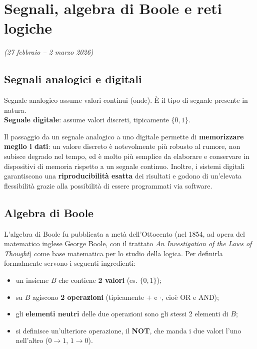 \chapter{Segnali, algebra di Boole e reti logiche}
\label{ch:boole-intro}
\textit{(27 febbraio -- 2 marzo 2026)}

\section{Segnali analogici e digitali}

\begin{definizione}{Segnale analogico}
assume valori continui (onde). È il tipo di segnale presente in natura.\\[0.3em]
\textbf{Segnale digitale}: assume valori discreti, tipicamente $\{0,1\}$.
\end{definizione}

Il passaggio da un segnale analogico a uno digitale permette di \textbf{memorizzare meglio i dati}: un valore discreto è notevolmente più robusto al rumore, non subisce degrado nel tempo, ed è molto più semplice da elaborare e conservare in dispositivi di memoria rispetto a un segnale continuo. Inoltre, i sistemi digitali garantiscono una \textbf{riproducibilità esatta} dei risultati e godono di un'elevata flessibilità grazie alla possibilità di essere programmati via software.

\section{Algebra di Boole}

L'algebra di Boole fu pubblicata a metà dell'Ottocento (nel 1854, ad opera del matematico inglese George Boole, con il trattato \emph{An Investigation of the Laws of Thought}) come base matematica per lo studio della logica. Per definirla formalmente servono i seguenti ingredienti:

\begin{itemize}[leftmargin=1.5em]
    \item un insieme $B$ che contiene \textbf{2 valori} (es. $\{0,1\}$);
    \item su $B$ agiscono \textbf{2 operazioni} (tipicamente $+$ e $\cdot$, cioè OR e AND);
    \item gli \textbf{elementi neutri} delle due operazioni sono gli stessi 2 elementi di $B$;
    \item si definisce un'ulteriore operazione, il \textbf{NOT}, che manda i due valori l'uno nell'altro ($0\to1$, $1\to0$).
\end{itemize}

